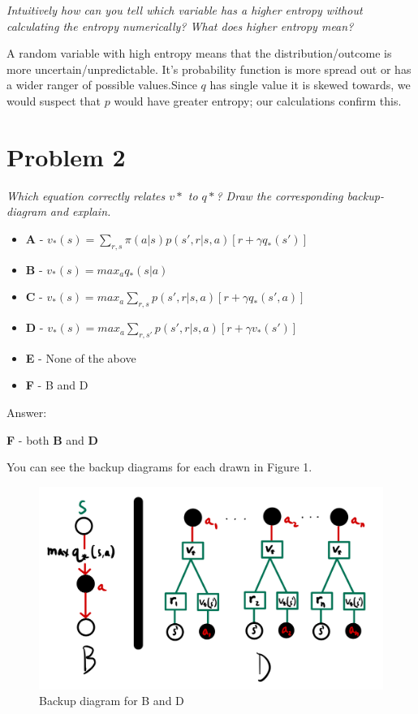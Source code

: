 \documentclass{article}
\begin{document}
\textit{Intuitively how can you tell which variable has a higher entropy without calculating the entropy numerically? What does higher entropy mean?}

A random variable with high entropy means that the distribution/outcome is more uncertain/unpredictable. It's probability function is more spread out or has a wider ranger of possible values.Since $q$ has single value it is skewed towards, we would suspect that $p$ would have greater entropy; our calculations confirm this.


\section*{Problem 2}

\textit{Which equation correctly relates $v*$ to $q*$? Draw the corresponding backup-diagram and explain.}

\begin{itemize}
    \item \textbf{A} - $v_*(s) = \sum_{r,s} \pi(a|s)p(s', r|s,a)[r+\gamma q_* (s')]$
    \item \textbf{B} - $v_*(s) = max_a q_*(s|a)$
    \item \textbf{C} - $v_*(s)= max_a \sum_{r,s} p(s', r|s,a)[r+\gamma q_*(s',a)]$
    \item \textbf{D} - $v_*(s) = max_a \sum_{r,s'} p(s',r|s, a)[r+\gamma v_*(s')] $
    \item \textbf{E} - None of the above
    \item \textbf{F} - B and D
\end{itemize}

Answer:

\textbf{F} - both \textbf{B} and \textbf{D}

You can see the backup diagrams for each drawn in Figure 1.

\begin{figure}
    \centering
    \includegraphics[width=.8\linewidth]{imgs/midterm.backup.diagram.png}
    \caption{Backup diagram for B and D}
\end{figure}
\end{document}
